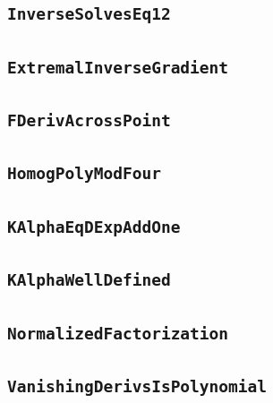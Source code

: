 \documentclass[11pt]{amsart}
\theoremstyle{definition}
\begin{document}
\subsection{\texorpdfstring{\texttt{InverseSolvesEq12}}{InverseSolvesEq12}}\label{node:InverseSolvesEq12}


\subsection{\texorpdfstring{\texttt{ExtremalInverseGradient}}{ExtremalInverseGradient}}\label{node:ExtremalInverseGradient}


\subsection{\texorpdfstring{\texttt{FDerivAcrossPoint}}{FDerivAcrossPoint}}\label{node:FDerivAcrossPoint}


\subsection{\texorpdfstring{\texttt{HomogPolyModFour}}{HomogPolyModFour}}\label{node:HomogPolyModFour}


\subsection{\texorpdfstring{\texttt{KAlphaEqDExpAddOne}}{KAlphaEqDExpAddOne}}\label{node:KAlphaEqDExpAddOne}


\subsection{\texorpdfstring{\texttt{KAlphaWellDefined}}{KAlphaWellDefined}}\label{node:KAlphaWellDefined}


\subsection{\texorpdfstring{\texttt{NormalizedFactorization}}{NormalizedFactorization}}\label{node:NormalizedFactorization}


\subsection{\texorpdfstring{\texttt{VanishingDerivsIsPolynomial}}{VanishingDerivsIsPolynomial}}\label{node:VanishingDerivsIsPolynomial}

\end{document}

